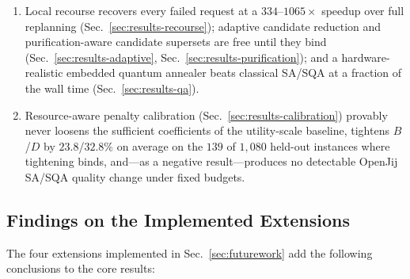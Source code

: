 \documentclass[10pt,a4paper]{article}
\begin{document}
\begin{enumerate}
    reliability: Metropolis and the hybrid pipeline deliver with zero
    SLA violations, while a sub-optimal SQA plan violates up to $8\%$
    of deliveries---a direct price of its $46\%$ mean optimality gap,
    certified against exact ILP (Sec.~\ref{sec:results-recourse}).
  \item Local recourse recovers every failed request at a
    $334$--$1065\times$ speedup over full replanning
    (Sec.~\ref{sec:results-recourse}); adaptive candidate reduction and
    purification-aware candidate supersets are free until they bind
    (Sec.~\ref{sec:results-adaptive}, Sec.~\ref{sec:results-purification});
    and a hardware-realistic embedded quantum annealer beats classical
    SA/SQA at a fraction of the wall time
    (Sec.~\ref{sec:results-qa}).
  \item Resource-aware penalty calibration
    (Sec.~\ref{sec:results-calibration}) provably never loosens the
    sufficient coefficients of the utility-scale baseline, tightens
    $B$/$D$ by $23.8$/$32.8\%$ on average on the $139$ of $1{,}080$
    held-out instances where tightening binds, and---as a negative
    result---produces no detectable OpenJij SA/SQA quality change
    under fixed budgets.
\end{enumerate}

\subsection{Findings on the Implemented Extensions}

The four extensions implemented in Sec.~\ref{sec:futurework} add the
following conclusions to the core results:
\end{document}
